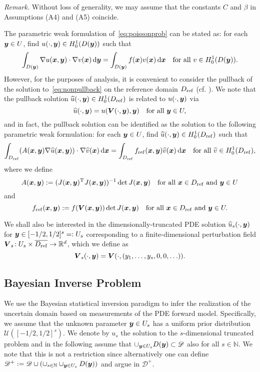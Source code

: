 \documentclass[graybox]{svmult}
\begin{document}
{\em Remark.} Without loss of generality, we may assume that the constants $C$ and $\beta$ in Assumptions (A4) and (A5) coincide.

The parametric weak formulation of~\eqref{eq:poissonprob} can be stated as: for each ${\boldsymbol{y}}\in U$, find $u(\cdot,{\boldsymbol{y}})\in H_0^1(D({\boldsymbol{y}}))$ such that
\begin{align}
\int_{D({\boldsymbol{y}})}\nabla u({\boldsymbol{x}},{\boldsymbol{y}})\cdot \nabla v({\boldsymbol{x}})\,{\rm d}{\boldsymbol{y}}=\int_{D({\boldsymbol{y}})}f({\boldsymbol{x}})v({\boldsymbol{x}})\,{\rm d}{\boldsymbol{x}}\quad\text{for all}~v\in H_0^1(D({\boldsymbol{y}})).\label{eq:nonpullback}
\end{align}
However, for the purposes of analysis, it is convenient to consider the pullback of the solution to~\eqref{eq:nonpullback} on the reference domain $D_{\rm ref}$ (cf. \cite{harbrecht16}). We note that the pullback solution $\widehat u(\cdot,{\boldsymbol{y}})\in H_0^1(D_{\rm ref})$ is related to $u(\cdot,{\boldsymbol{y}})$ via
$$
\widehat u(\cdot,{\boldsymbol{y}})=u(\boldsymbol V(\cdot,{\boldsymbol{y}}),{\boldsymbol{y}})\quad\text{for all}~{\boldsymbol{y}}\in U,
$$
and in fact, the pullback solution can be identified as the solution to the following parametric weak formulation: for each ${\boldsymbol{y}}\in U$, find $\widehat u(\cdot,{\boldsymbol{y}})\in H_0^1(D_{\rm ref})$ such that
$$
\int_{D_{\rm ref}}(A({\boldsymbol{x}},{\boldsymbol{y}})\nabla \widehat u({\boldsymbol{x}},{\boldsymbol{y}}))\cdot \nabla \widehat v({\boldsymbol{x}})\,{\rm d}{\boldsymbol{x}}=\int_{D_{\rm ref}}f_{\rm ref}({\boldsymbol{x}},{\boldsymbol{y}})\widehat v({\boldsymbol{x}})\,{\rm d}{\boldsymbol{x}}\quad\text{for all}~\widehat v\in H_0^1(D_{\rm ref}),
$$
where we define
$$
A({\boldsymbol{x}},{\boldsymbol{y}}):=(J({\boldsymbol{x}},{\boldsymbol{y}})^{\rm T}J({\boldsymbol{x}},{\boldsymbol{y}}))^{-1}\det J({\boldsymbol{x}},{\boldsymbol{y}})\quad\text{for all}~{\boldsymbol{x}}\in D_{\rm ref}~\text{and}~{\boldsymbol{y}}\in U
$$
and
$$
f_{\rm ref}({\boldsymbol{x}},{\boldsymbol{y}}):=f(\boldsymbol V({\boldsymbol{x}},{\boldsymbol{y}}))\det J({\boldsymbol{x}},{\boldsymbol{y}})\quad\text{for all}~{\boldsymbol{x}}\in D_{\rm ref}~\text{and}~{\boldsymbol{y}}\in U.
$$

We shall also be interested in the dimensionally-truncated PDE solution $\widehat u_s(\cdot,{\boldsymbol{y}})$ for ${\boldsymbol{y}}\in [-1/2,1/2]^s=:U_s$ corresponding to a finite-dimensional perturbation field $\boldsymbol V_s\!:U_s\times \overline{D_{\rm ref}}\to \mathbb R^d$, which we define as
$$
\boldsymbol V_s(\cdot,{\boldsymbol{y}})=\boldsymbol V(\cdot,(y_1,\ldots,y_s,0,0,\ldots)).
$$

\subsection{Bayesian Inverse Problem}
\label{subsec: Bayes}
We use the Bayesian statistical inversion paradigm to infer the realization of the uncertain domain based on measurements of the PDE forward model. Specifically, we assume that the unknown parameter ${\boldsymbol{y}}\in U_s$ has a uniform prior distribution $\mathcal U([-1/2,1/2]^s)$. We denote by $u_s$ the solution to the $s$-dimensional truncated problem  and in the following assume that $\cup_{{\boldsymbol{y}} \in U_s} D({\boldsymbol{y}}) \subset \mathscr D$ also for all $s \in \mathbb{N}$. We note that this is not a restriction since alternatively one can define $\mathscr D^+ := \mathscr D \cup (\cup_{s \in \mathbb{N}} \cup_{{\boldsymbol{y}} \in U_s} D({\boldsymbol{y}})) $ and argue in $\mathscr D^+$. 
\end{document}
